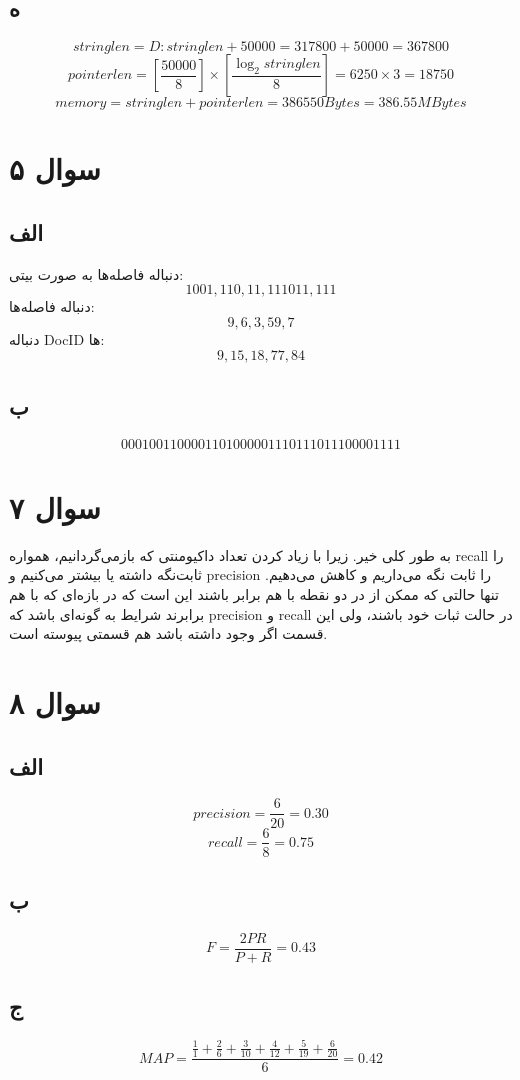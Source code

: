 \documentclass[11pt]{article}
\begin{document}
\subsection{ه}
$$ stringlen = D:stringlen + 50000 = 317800 + 50000 = 367800 $$
$$ pointerlen = [\frac{50000}{8}] \times [\frac{\log _2 stringlen}{8}] = 6250 \times 3 = 18750 $$
$$ memory = stringlen + pointerlen = 386550 Bytes = 386.55 MBytes $$

\section{سوال ۵}
\subsection{الف}
دنباله فاصله‌ها به صورت بیتی:
$$ 1001, 110, 11, 111011, 111 $$
دنباله فاصله‌ها:
$$ 9, 6, 3, 59, 7 $$
دنباله‌ DocID ها: 
$$ 9, 15, 18, 77, 84 $$
\subsection{ب}
$$ 0001001100001101000001110111011100001111 $$

\section{سوال ۷}
به طور کلی خیر. زیرا با زیاد کردن تعداد داکیومنتی که بازمی‌گردانیم، همواره recall را ثابت‌نگه داشته یا بیشتر می‌کنیم و precision را ثابت نگه می‌داریم و کاهش می‌دهیم. تنها حالتی که ممکن از در دو نقطه با هم برابر باشند این است که در بازه‌ای که با هم برابرند شرایط به گونه‌ای باشد که precision و recall در حالت ثبات خود باشند، ولی این قسمت اگر وجود داشته باشد هم قسمتی پیوسته است.
\section{سوال ۸}
\subsection{الف}
$$ precision = \frac{6}{20} = 0.30 $$
$$ recall = \frac{6}{8} = 0.75 $$
\subsection{ب}
$$ F = \frac{2PR}{P + R} = 0.43 $$
\subsection{ج}
$$ MAP = \frac{\frac{1}{1} + \frac{2}{6} + \frac{3}{10} + \frac{4}{12} + \frac{5}{19} + \frac{6}{20}}{6} = 0.42 $$
\end{document}
